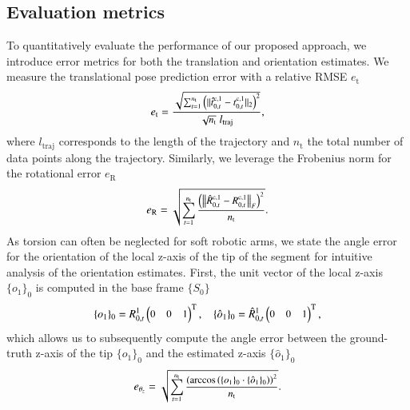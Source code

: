 \subsection{Evaluation metrics}
To quantitatively evaluate the performance of our proposed approach, we introduce error metrics for both the translation and orientation estimates.
%
We measure the translational pose prediction error with a relative \gls{RMSE} $e_\mathrm{t}$
\begin{equation}\label{eq:srslam:evaluation_translational_error}\small
    e_\mathrm{t} = \frac{\sqrt{\sum_{t=1}^{n_\mathrm{t}} \left (\lVert \hat{t}_{0,t}^{\mathrm{c},1} - t_{0,t}^{\mathrm{c},1} \rVert_2 \right )^2}}{\sqrt{n_\mathrm{t}} \; l_\mathrm{traj}},
\end{equation}
where $l_\mathrm{traj}$ corresponds to the length of the trajectory and $n_\mathrm{t}$ the total number of data points along the trajectory. Similarly, we leverage the Frobenius norm for the rotational error $e_\mathrm{R}$
\begin{equation}\label{eq:srslam:evaluation_rotational_error}\small
    e_\mathrm{R} = \sqrt{\sum_{t=1}^{n_\mathrm{t}} \frac{\left (\big\lVert \hat{R}_{0,t}^{\mathrm{c},1} - R_{0,t}^{\mathrm{c},1} \big\rVert_F \right )^2}{n_\mathrm{t}}}.
\end{equation}
As torsion can often be neglected for soft robotic arms, we state the angle error for the orientation of the local z-axis of the tip of the segment for intuitive analysis of the orientation estimates. First, the unit vector of the local z-axis $\{ o_{1} \}_{0}$ is computed in the base frame $\{ S_0 \}$
\begin{equation}\small
    \{ o_1 \}_0 = R_{0,t}^{1}\begin{pmatrix}0 & 0 & 1\end{pmatrix}^\mathrm{T},
    \quad
    \{ \hat{o}_1 \}_0 = \hat{R}_{0,t}^{1}\begin{pmatrix}0 & 0 & 1\end{pmatrix}^\mathrm{T},
\end{equation}
which allows us to subsequently compute the angle error between the ground-truth z-axis of the tip $\{ o_1 \}_0$ and the estimated z-axis $ \{ \hat{o}_1 \}_0$
\begin{equation}\label{eq:srslam:evaluation_angle_error}\small
    e_{\theta_z} = \sqrt{\sum_{t=1}^{n_\mathrm{t}} \frac{\left (\arccos \left ( \{ o_1 \}_0 \cdot \{ \hat{o}_1 \}_0 \right ) \right )^2}{n_\mathrm{t}}}.
\end{equation}

